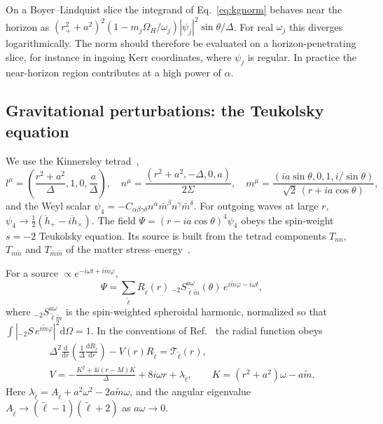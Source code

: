 \documentclass[11pt]{article}
\newcommand{\dd}{\mathrm{d}}
\begin{document}
On a Boyer--Lindquist slice the integrand of Eq.~\eqref{eq:kgnorm} behaves near the horizon as $(r_+^2+a^2)^2(1-m_j\Omega_H/\omega_j)|\psi_j|^2\sin\theta/\Delta$. For real $\omega_j$ this diverges logarithmically. The norm should therefore be evaluated on a horizon-penetrating slice, for instance in ingoing Kerr coordinates, where $\psi_j$ is regular. In practice the near-horizon region contributes at a high power of $\alpha$.

\subsection{Gravitational perturbations: the Teukolsky equation}

We use the Kinnersley tetrad~\cite{Kinnersley69},
\begin{equation}
l^\mu=\left(\frac{r^2+a^2}{\Delta},1,0,\frac a\Delta\right),\quad
n^\mu=\frac{(r^2+a^2,-\Delta,0,a)}{2\Sigma},\quad
m^\mu=\frac{(ia\sin\theta,0,1,i/\sin\theta)}{\sqrt2\,(r+ia\cos\theta)},
\end{equation}
and the Weyl scalar $\psi_4=-C_{\alpha\beta\gamma\delta}n^\alpha\bar m^\beta n^\gamma\bar m^\delta$. For outgoing waves at large $r$, $\psi_4\to\frac12(\ddot h_+-i\ddot h_\times)$. The field $\Psi=(r-ia\cos\theta)^4\psi_4$ obeys the spin-weight $s=-2$ Teukolsky equation. Its source is built from the tetrad components $T_{nn}$, $T_{n\bar m}$ and $T_{\bar m\bar m}$ of the matter stress--energy~\cite{Teukolsky73}.

For a source $\propto e^{-i\omega t+i\tilde m\varphi}$,
\begin{equation}
\Psi=\sum_{\tilde\ell}R_{\tilde\ell}(r)\,{}_{-2}S_{\tilde\ell\tilde m}^{a\omega}(\theta)\,e^{i\tilde m\varphi-i\omega t},
\end{equation}
where ${}_{-2}S^{a\omega}_{\tilde\ell\tilde m}$ is the spin-weighted spheroidal harmonic, normalized so that $\int|{}_{-2}S\,e^{i\tilde m\varphi}|^2\dd\Omega=1$. In the conventions of Ref.~\cite{Hughes00} the radial function obeys
\begin{gather}
\Delta^2\frac{\dd}{\dd r}\left(\frac1\Delta\frac{\dd R_{\tilde\ell}}{\dd r}\right)-V(r)R_{\tilde\ell}=\mathcal T_{\tilde\ell}(r),\label{eq:teuk}\\
V=-\frac{K^2+4i(r-M)K}{\Delta}+8i\omega r+\lambda_{\tilde\ell},\qquad K=(r^2+a^2)\omega-a\tilde m .\nonumber
\end{gather}
Here $\lambda_{\tilde\ell}=A_{\tilde\ell}+a^2\omega^2-2a\tilde m\omega$, and the angular eigenvalue $A_{\tilde\ell}\to(\tilde\ell-1)(\tilde\ell+2)$ as $a\omega\to0$.
\end{document}
